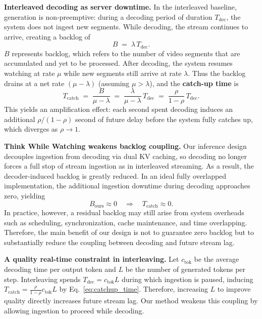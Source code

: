 \documentclass{article}
\begin{document}
\noindent\textbf{Interleaved decoding as server downtime.}
In the interleaved baseline, generation is non-preemptive: during a decoding period of duration $T_{\mathrm{dec}}$, the system does not ingest new segments. While decoding, the stream continues to arrive, creating a backlog of
\begin{equation}
B \;=\; \lambda\, T_{\mathrm{dec}} .
\label{eq:backlog_size}
\end{equation}
$B$ represents backlog, which refers to the number of video segments that are accumulated and yet to be processed. After decoding, the system resumes watching at rate $\mu$ while new segments still arrive at rate $\lambda$. Thus the backlog drains at a net rate $(\mu-\lambda)$ (assuming $\mu>\lambda$), and the \textbf{catch-up time} is
\begin{equation}
T_{\mathrm{catch}}
\;=\;
\frac{B}{\mu-\lambda}
\;=\;
\frac{\lambda}{\mu-\lambda}\, T_{\mathrm{dec}}
\;=\;
\frac{\rho}{1-\rho}\, T_{\mathrm{dec}} .
\label{eq:catchup_time}
\end{equation}
This yields an amplification effect: each second spent decoding induces an additional $\rho/(1-\rho)$ second of future delay before the system fully catches up, which diverges as $\rho \rightarrow 1$.

\noindent\textbf{Think While Watching weakens backlog coupling.}
Our inference design decouples ingestion from decoding via dual KV caching, so decoding no longer forces a full stop of stream ingestion as in interleaved streaming. As a result, the decoder-induced backlog is greatly reduced. In an ideal fully overlapped implementation, the additional ingestion downtime during decoding approaches zero, yielding
\begin{equation}
B_{\mathrm{ours}} \approx 0 \quad\Rightarrow\quad T_{\mathrm{catch}} \approx 0 .
\end{equation}
In practice, however, a residual backlog may still arise from system overheads such as scheduling, synchronization, cache maintenance, and time overlapping. Therefore, the main benefit of our design is not to guarantee zero backlog but to substantially reduce the coupling between decoding and future stream lag.

\noindent\textbf{A quality real-time constraint in interleaving.}
Let $c_{\mathrm{tok}}$ be the average decoding time per output token and $L$ be the number of generated tokens per step. Interleaving spends $T_{\mathrm{dec}} = c_{\mathrm{tok}}L$ during which ingestion is paused, inducing
$T_{\mathrm{catch}}=\frac{\rho}{1-\rho}c_{\mathrm{tok}}L$ by Eq.~\eqref{eq:catchup_time}. Therefore, increasing $L$ to improve quality directly increases future stream lag. Our method weakens this coupling by allowing ingestion to proceed while decoding.
\end{document}
